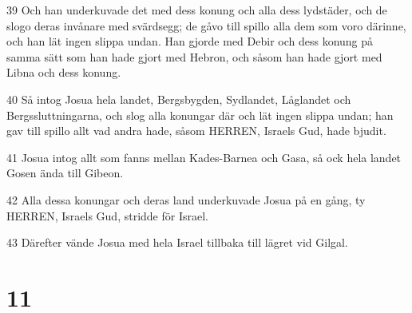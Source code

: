 \par 39 Och han underkuvade det med dess konung och alla dess lydstäder, och de slogo deras invånare med svärdsegg; de gåvo till spillo alla dem som voro därinne, och han lät ingen slippa undan. Han gjorde med Debir och dess konung på samma sätt som han hade gjort med Hebron, och såsom han hade gjort med Libna och dess konung.
\par 40 Så intog Josua hela landet, Bergsbygden, Sydlandet, Låglandet och Bergssluttningarna, och slog alla konungar där och lät ingen slippa undan; han gav till spillo allt vad andra hade, såsom HERREN, Israels Gud, hade bjudit.
\par 41 Josua intog allt som fanns mellan Kades-Barnea och Gasa, så ock hela landet Gosen ända till Gibeon.
\par 42 Alla dessa konungar och deras land underkuvade Josua på en gång, ty HERREN, Israels Gud, stridde för Israel.
\par 43 Därefter vände Josua med hela Israel tillbaka till lägret vid Gilgal.

\chapter{11}

